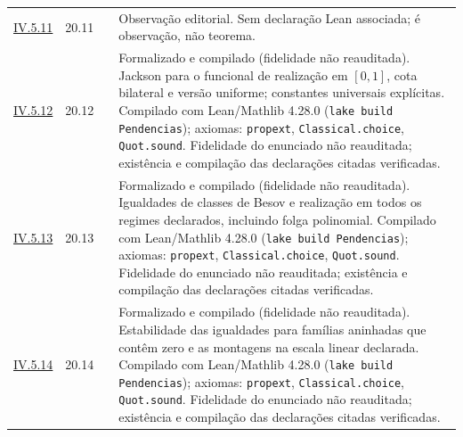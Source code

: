 \documentclass[12pt,a4paper]{article}
\theoremstyle{preciso}
\theoremstyle{definition}
\theoremstyle{preciso}
\theoremstyle{preciso}
\theoremstyle{preciso}
\theoremstyle{preciso}
\theoremstyle{definition}
\theoremstyle{preciso}
\theoremstyle{definition}
\theoremstyle{preciso}
\theoremstyle{preciso}
\theoremstyle{definition}
\begin{document}
\begin{singlespace}
\begin{longtable}{@{}p{.11\linewidth}p{.09\linewidth}p{.09\linewidth}p{.59\linewidth}@{}}
\hyperref[map:artigo_3:5.11]{IV.5.11} & 20.11 & \pageref{map:artigo_3:5.11} & Observação editorial. Sem declaração Lean associada; é observação, não teorema.\\[4pt]
\hyperref[map:artigo_3:5.12]{IV.5.12} & 20.12 & \pageref{map:artigo_3:5.12} & Formalizado e compilado (fidelidade não reauditada). Jackson para o funcional de realização em $[0,1]$, cota bilateral e versão uniforme; constantes universais explícitas. Compilado com Lean/Mathlib 4.28.0 (\texttt{lake build Pendencias}); axiomas: \texttt{propext}, \texttt{Classical.choice}, \texttt{Quot.sound}. Fidelidade do enunciado não reauditada; existência e compilação das declarações citadas verificadas.\\[4pt]
\hyperref[map:artigo_3:5.13]{IV.5.13} & 20.13 & \pageref{map:artigo_3:5.13} & Formalizado e compilado (fidelidade não reauditada). Igualdades de classes de Besov e realização em todos os regimes declarados, incluindo folga polinomial. Compilado com Lean/Mathlib 4.28.0 (\texttt{lake build Pendencias}); axiomas: \texttt{propext}, \texttt{Classical.choice}, \texttt{Quot.sound}. Fidelidade do enunciado não reauditada; existência e compilação das declarações citadas verificadas.\\[4pt]
\hyperref[map:artigo_3:5.14]{IV.5.14} & 20.14 & \pageref{map:artigo_3:5.14} & Formalizado e compilado (fidelidade não reauditada). Estabilidade das igualdades para famílias aninhadas que contêm zero e as montagens na escala linear declarada. Compilado com Lean/Mathlib 4.28.0 (\texttt{lake build Pendencias}); axiomas: \texttt{propext}, \texttt{Classical.choice}, \texttt{Quot.sound}. Fidelidade do enunciado não reauditada; existência e compilação das declarações citadas verificadas.\\[4pt]
\bottomrule\end{longtable}\normalsize


\end{singlespace}
\end{document}
